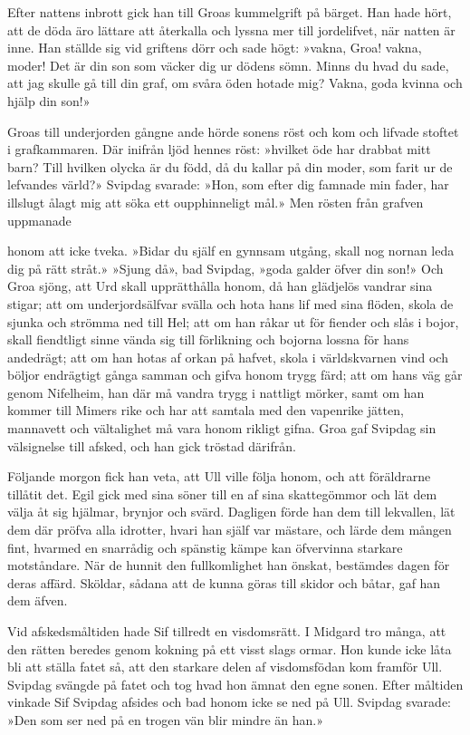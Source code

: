 Efter nattens inbrott gick han till Groas kummelgrift på bärget. Han
hade hört, att de döda äro lättare att återkalla och lyssna mer till
jordelifvet, när natten är inne. Han ställde sig vid griftens dörr och
sade högt: »vakna, Groa! vakna, moder! Det är din son som väcker dig ur
dödens sömn. Minns du hvad du sade, att jag skulle gå till din graf, om
svåra öden hotade mig? Vakna, goda kvinna och hjälp din son!»

Groas till underjorden gångne ande hörde sonens röst och kom och lifvade
stoftet i grafkammaren. Där inifrån ljöd hennes röst: »hvilket öde har
drabbat mitt barn? Till hvilken olycka är du född, då du kallar på din
moder, som farit ur de lefvandes värld?» Svipdag svarade: »Hon, som
efter dig famnade min fader, har illslugt ålagt mig att söka ett
oupphinneligt mål.» Men rösten från grafven uppmanade

honom att icke tveka. »Bidar du själf en gynnsam utgång, skall nog
nornan leda dig på rätt stråt.» »Sjung då», bad Svipdag, »goda galder
öfver din son!» Och Groa sjöng, att Urd skall upprätthålla honom, då han
glädjelös vandrar sina stigar; att om underjordsälfvar svälla och hota
hans lif med sina flöden, skola de sjunka och strömma ned till Hel; att
om han råkar ut för fiender och slås i bojor, skall fiendtligt sinne
vända sig till förlikning och bojorna lossna för hans andedrägt; att om
han hotas af orkan på hafvet, skola i världskvarnen vind och böljor
endrägtigt gånga samman och gifva honom trygg färd; att om hans väg går
genom Nifelheim, han där må vandra trygg i nattligt mörker, samt om han
kommer till Mimers rike och har att samtala med den vapenrike jätten,
mannavett och vältalighet må vara honom rikligt gifna. Groa gaf Svipdag
sin välsignelse till afsked, och han gick tröstad därifrån.

Följande morgon fick han veta, att Ull ville följa honom, och att
föräldrarne tillåtit det. Egil gick med sina söner till en af sina
skattegömmor och lät dem välja åt sig hjälmar, brynjor och svärd.
Dagligen förde han dem till lekvallen, lät dem där pröfva alla idrotter,
hvari han själf var mästare, och lärde dem mången fint, hvarmed en
snarrådig och spänstig kämpe kan öfvervinna starkare motståndare. När de
hunnit den fullkomlighet han önskat, bestämdes dagen för deras affärd.
Sköldar, sådana att de kunna göras till skidor och båtar, gaf han dem
äfven.

Vid afskedsmåltiden hade Sif tillredt en visdomsrätt. I Midgard tro
många, att den rätten beredes genom kokning på ett visst slags ormar.
Hon kunde icke låta bli att ställa fatet så, att den starkare delen af
visdomsfödan kom framför Ull. Svipdag svängde på fatet och tog hvad hon
ämnat den egne sonen. Efter måltiden vinkade Sif Svipdag afsides och bad
honom icke se ned på Ull. Svipdag svarade: »Den som ser ned på en trogen
vän blir mindre än han.»

